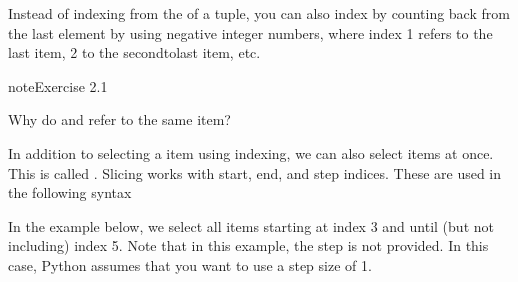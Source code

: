 \documentclass[letterpaper,10pt,english]{jupyterBook}
\begin{document}
\sphinxAtStartPar
Instead of indexing from the  of a tuple, you can also index by counting back from the last element by using negative integer numbers, where index \sphinxhyphen{}1 refers to the last item, \sphinxhyphen{}2 to the second\sphinxhyphen{}to\sphinxhyphen{}last item, etc.

\begin{sphinxadmonition}{note}{Exercise 2.1}

\sphinxAtStartPar
Why do  and  refer to the same item?
\end{sphinxadmonition}

\sphinxAtStartPar
In addition to selecting a  item using indexing, we can also select  items at once. This is called . Slicing works with start, end, and step indices. These are used in the following syntax

\begin{sphinxVerbatim}[commandchars=\\\{\}]
  \PYG{p}{[}\PYG{p}{]}
\end{sphinxVerbatim}

\sphinxAtStartPar
In the example below, we select all items starting at index 3 and until (but not including) index 5. Note that in this example, the step is not provided. In this case, Python assumes that you want to use a step size of 1.
\end{document}

